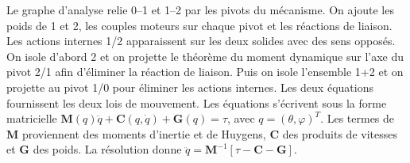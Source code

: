\begin{corrigebox}
Le graphe d'analyse relie 0--1 et 1--2 par les pivots du mécanisme.
                On ajoute les poids de 1 et 2, les couples moteurs sur chaque pivot et les
                réactions de liaison. Les actions internes 1/2 apparaissent sur les deux
                solides avec des sens opposés.
On isole d'abord 2 et on projette le théorème du moment dynamique sur
                l'axe du pivot 2/1 afin d'éliminer la réaction de liaison. Puis on isole
                l'ensemble 1+2 et on projette au pivot 1/0 pour éliminer les actions
                internes. Les deux équations fournissent les deux lois de mouvement.
Les équations s'écrivent sous la forme matricielle
                $\mathbf M(q)\ddot q+\mathbf C(q,\dot q)+\mathbf G(q)=\tau$, avec
                $q=(\theta,\varphi)^T$. Les termes de $\mathbf M$ proviennent des moments
                d'inertie et de Huygens, $\mathbf C$ des produits de vitesses et
                $\mathbf G$ des poids. La résolution donne $\ddot q=\mathbf M^{-1}
                [\tau-\mathbf C-\mathbf G]$.
\end{corrigebox}
